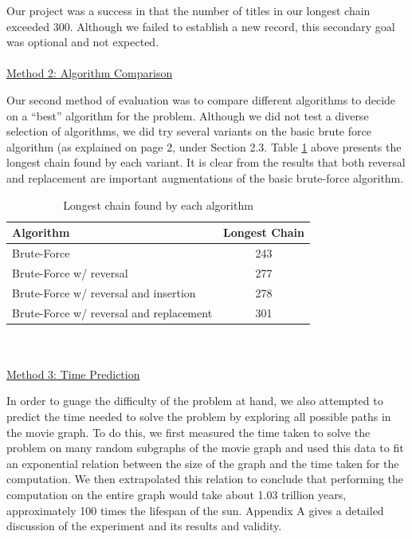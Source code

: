 \documentclass[11pt,english]{article}
\begin{document}
Our project was a success in that the number of titles in our longest chain
exceeded 300. Although we failed to establish a new record, this secondary goal
was optional and not expected.\\\\
\underline{Method 2: Algorithm Comparison}

Our second method of evaluation was to compare different algorithms to
decide on a ``best'' algorithm for the problem. Although we did not test a
diverse selection of algorithms, we did try several variants on the basic
brute force algorithm (as explained on page 2, under Section 2.3. Table
\ref{tab:algos} above presents the longest chain found by each variant. It is
clear from the results that both reversal and replacement are important
augmentations of the basic brute-force algorithm.
\begin{table}
\centering
\begin{tabular}{l|c}
Algorithm                               & Longest Chain \\
\hline
Brute-Force                             & 243           \\
Brute-Force w/ reversal                 & 277           \\
Brute-Force w/ reversal and insertion   & 278           \\
Brute-Force w/ reversal and replacement & 301           \\
\end{tabular}
\caption{Longest chain found by each algorithm}
\vspace{-4mm}
\label{tab:algos}
\end{table}
\\\\
\underline{Method 3: Time Prediction}

In order to guage the difficulty of the problem at hand, we also attempted to
predict the time needed to solve the problem by exploring all possible paths
in the movie graph. To do this, we first measured the time taken to solve the
problem on many random subgraphs of the movie graph and used this data to fit
an exponential relation between the size of the graph and the time taken for
the computation. We then extrapolated this relation to conclude that performing
the computation on the entire graph would take about 1.03 trillion years,
approximately 100 times the lifespan of the sun. Appendix A gives a detailed
discussion of the experiment and its results and validity.
\end{document}
